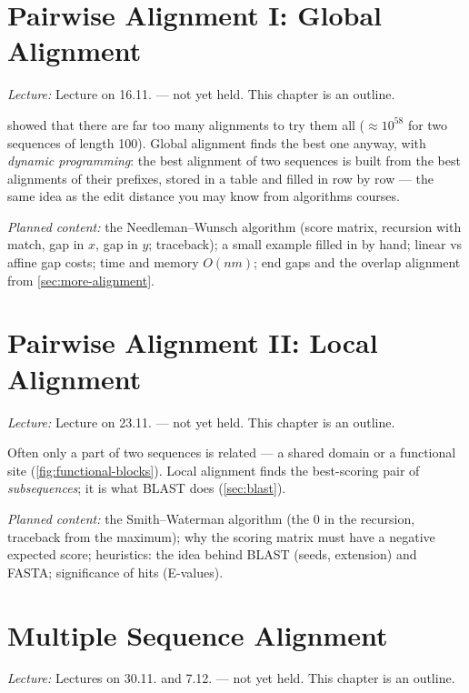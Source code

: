 \documentclass[11pt, oneside]{book}
\newcommand{\lectureref}[1]{%
  \par{\small\color{gray!70!black}\textit{Lecture:} #1}\par}
\newcommand{\planned}[1]{%
  \par{\small\color{gray!70!black}\textit{Planned content:} #1}\par}
\begin{document}
\chapter{Pairwise Alignment I: Global Alignment}
\label{ch:global}

\lectureref{Lecture on 16.11. --- not yet held. This chapter is an outline.}

 showed that there are far too many alignments to try them all
($\approx 10^{58}$ for two sequences of length 100). Global alignment finds the
best one anyway, with \emph{dynamic programming}: the best alignment of two
sequences is built from the best alignments of their prefixes, stored in a
table and filled in row by row --- the same idea as the edit distance you may
know from algorithms courses.

\planned{the Needleman--Wunsch algorithm (score matrix, recursion with match,
gap in $x$, gap in $y$; traceback); a small example filled in by hand; linear
vs affine gap costs; time and memory $O(nm)$; end gaps and the overlap
alignment from \cref{sec:more-alignment}.}

\chapter{Pairwise Alignment II: Local Alignment}
\label{ch:local}

\lectureref{Lecture on 23.11. --- not yet held. This chapter is an outline.}

Often only a part of two sequences is related --- a shared domain or a
functional site (\cref{fig:functional-blocks}). Local alignment finds the
best-scoring pair of \emph{subsequences}; it is what BLAST does
(\cref{sec:blast}).

\planned{the Smith--Waterman algorithm (the 0 in the recursion, traceback from
the maximum); why the scoring matrix must have a negative expected score;
heuristics: the idea behind BLAST (seeds, extension) and FASTA; significance
of hits (E-values).}

\chapter{Multiple Sequence Alignment}
\label{ch:msa}

\lectureref{Lectures on 30.11. and 7.12. --- not yet held. This chapter is an
outline.}
\end{document}
